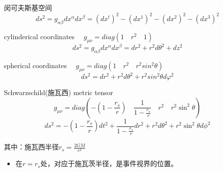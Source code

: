 \documentclass[12pt, a4paper, oneside, UTF8]{ctexbook}  %
\begin{document}
\begin{example}
    闵可夫斯基空间
\[
    ds^2=g_{\alpha\beta}dx^\alpha dx^\beta=(dx^t)^2-(dx^1)^2-(dx^2)^2-(dx^3)^2
\]
\end{example}
\begin{example}
    cylinderical coordinates $\quad g_{\mu\nu}=diag(1\quad r^2\quad 1)$
    \[
        ds^2=g_{\alpha\beta}dx^\alpha dx^\beta=dr^2+r^2d\theta^2+dz^2
    \]
\end{example}
\begin{example}
    spherical coordinates $\quad g_{\mu\nu}=diag(1\quad r^2\quad r^2sin^2\theta)$
    \[
    ds^2=dr^2+r^2d\theta^2+r^2sin^2\theta d\varphi^2
    \]
\end{example}
\begin{example}
    Schwarzschild(施瓦西) metric tensor
    \[
    g_{\mu\nu}=diag\left(-\left(1 - \frac{r_s}{r}\right)\quad
    \frac{1}{1 - \frac{r_s}{r}}\quad r^2\quad r^2 \sin^2\theta\right)
    \]
    \[
ds^2 = -\left(1 - \frac{r_s}{r}\right) dt^2 + \frac{1}{1 - \frac{r_s}{r}} dr^2 + r^2 d\theta^2 + r^2 \sin^2\theta d\phi^2
\]

其中：施瓦西半径\(r_s=\frac{2GM}{c^2}\)
\begin{itemize}
    \item 在$r = r_s$处，对应于施瓦茨半径，是事件视界的位置。
\end{itemize}
\end{example}
\end{document}
